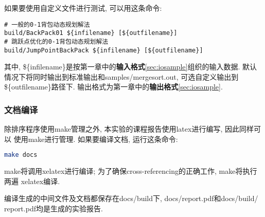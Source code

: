 如果要使用自定义文件进行测试, 可以用这条命令:
\begin{lstlisting}
# 一般的0-1背包动态规划解法
build/BackPack01 ${infilename} [${outfilename}]
# 跳跃点优化的0-1背包动态规划解法
build/JumpPointBackPack ${infilename} [${outfilename}]
\end{lstlisting}
其中, \$\{infilename\}是按第一章中的\textbf{输入格式}\ref{sec:iosample}组织的输入数据.
默认情况下将同时输出到标准输出和samples/mergesort.out, 可选自定义输出到
\$\{outfilename\}路径下. 输出格式为第一章中的\textbf{输出格式}\ref{sec:iosample}.

\subsubsection{文档编译}
除排序程序使用make管理之外, 本实验的课程报告使用latex进行编写, 因此同样可以
使用make进行管理. 如果要编译文档, 运行这条命令:
\begin{lstlisting}[language=bash]
make docs
\end{lstlisting}
make将调用xelatex进行编译; 为了确保cross-referencing的正确工作, make将执行两遍
xelatex编译.\par
编译生成的中间文件及文档都保存在docs/build下, docs/report.pdf和docs/build/
report.pdf均是生成的实验报告.


